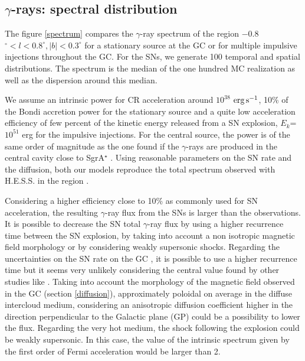 \documentclass[a4paper,fleqn,usenatbib]{mnras}
\begin{document}
%
\subsection{$\gamma$-rays: spectral distribution}
The figure \ref{spectrum} compares the $\gamma$-ray spectrum of the region −0.8$^\circ < l < 0.8^\circ, |b| < 0.3^\circ$ for a stationary source at the GC or for multiple impulsive injections throughout the GC. For the SNs, we generate 100 temporal and spatial distributions. The spectrum is the median of the one hundred MC realization as well as the dispersion around this median. 

We assume an intrinsic power for CR acceleration around $10^{38}$ $\rm erg \, s^{-1}$, 10\% of the Bondi accretion power \citep{2013Sci...341..981W} for the stationary source and a quite low acceleration efficiency of few percent of the kinetic energy released from a SN explosion, $E_k$=$10^{51}$ erg \citep{2011Ap&SS.336..257R} for the impulsive injections. For the central source, the power is of the same order of magnitude as the one found if the $\gamma$-rays are produced in the central cavity close to SgrA$^\star$ \citet{2016Natur.531..476H}. Using reasonable parameters on the SN rate and the diffusion, both our models reproduce the total spectrum observed with H.E.S.S. in the region \citep{2006Natur.439..695A}.


Considering a higher efficiency close to 10\% as commonly used for SN acceleration, the resulting $\gamma$-ray flux from the SNs is larger than the observations. It is possible to decrease the SN total $\gamma$-ray flux by using a higher recurrence time between the SN explosion, by taking into account a non isotropic magnetic field morphology or by considering weakly supersonic shocks. Regarding the uncertainties on the SN rate on the GC \citep{2011MNRAS.413..763C}, it is possible to use a higher recurrence time but it seems very unlikely considering the central value found by other studies like \citet{2015MNRAS.453..172P}. Taking into account the morphology of the magnetic field observed in the GC (section \ref{diffusion}), approximately poloidal on average in the diffuse intercloud medium, considering an anisotropic diffusion coefficient higher in the direction perpendicular to the Galactic plane (GP) could be a possibility to lower the flux. Regarding the very hot medium, the shock following the explosion could be weakly supersonic. In this case, the value of the intrinsic spectrum given by the first order of Fermi acceleration would be larger than 2. 
\end{document}
